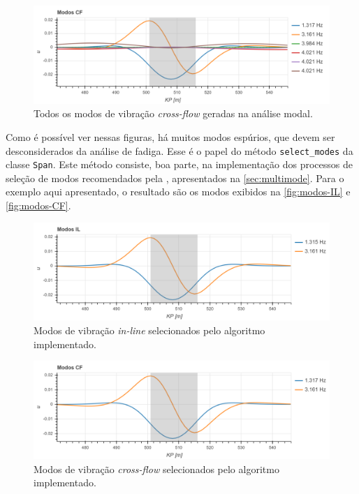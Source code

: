 \begin{figure}[H]
	\centering
	\caption{Todos os modos de vibração \textit{cross-flow} geradas na análise modal.}\label{fig:all-modos-CF}
	\includegraphics[width=\textwidth]{imagens/exemplo/all_modos_CF}
\end{figure}

Como é possível ver nessas figuras, há muitos modos espúrios, que devem ser desconsiderados da análise de fadiga. Esse é o papel do método \texttt{select\_modes} da classe \texttt{Span}. Este método consiste, boa parte, na implementação dos processos de seleção de modos recomendados pela , apresentados na
\autoref{sec:multimode}. Para o exemplo aqui apresentado, o resultado são os modos exibidos na \autoref{fig:modos-IL} e \autoref{fig:modos-CF}.

\begin{figure}[!ht]
	\centering
	\caption{Modos de vibração \textit{in-line} selecionados pelo algoritmo implementado.}\label{fig:modos-IL}
	\includegraphics[width=\textwidth]{imagens/exemplo/modos_IL}
\end{figure}

\begin{figure}[!ht]
	\centering
	\caption{Modos de vibração \textit{cross-flow} selecionados pelo algoritmo implementado.}\label{fig:modos-CF}
	\includegraphics[width=\textwidth]{imagens/exemplo/modos_CF}
\end{figure}

